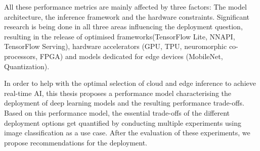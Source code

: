 All these performance metrics are mainly affected by three factors: The model architecture, the inference framework and the hardware constraints.
Significant research is being done in all three areas influencing the deployment question, resulting in the release of optimised frameworks(TensorFlow Lite, NNAPI, TensorFlow Serving), hardware accelerators (GPU, TPU, neuromorphic co-processors, FPGA) and models dedicated for edge devices (MobileNet, Quantization).


In order to help with the optimal selection of cloud and edge inference to achieve real-time AI, this thesis proposes a performance model characterising the deployment of deep learning models and the resulting performance trade-offs.
Based on this performance model, the essential trade-offs of the different deployment options get quantified by conducting multiple experiments using image classification as a use case. After the evaluation of these experiments, we propose recommendations for the deployment.




